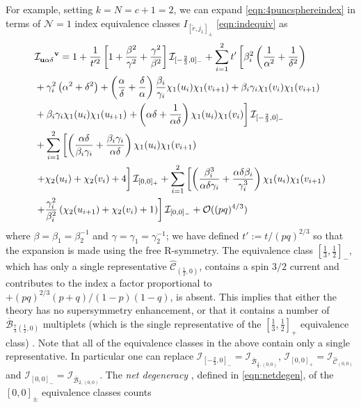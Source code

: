 \documentclass[main.tex]{subfiles}
\begin{document}
For example, setting $k=N=c+1=2$, we can expand \eqref{eqn:4puncsphereindex} in terms of $\mathcal{N}=1$ index equivalence classes $I_{[\widetilde{r},j_1]_{\pm}}$ \eqref{eqn:indequiv} \cite{Gadde:2009dj,Beem:2012yn,Evtikhiev:2017heo} as
\begin{equation}
\begin{aligned}
&\mathcal{I}\indices{_{\mathbf{u}\alpha\delta}^{\mathbf{v}}}=1+\frac{1}{t'^2}\left[1+\frac{\beta^2}{\gamma^2}+\frac{\gamma^2}{\beta^2}\right]\mathcal{I}_{[-\frac{2}{3},0]_-}+\sum_{i=1}^2t'\left[\beta_i^2\left(\frac{1}{\alpha^2}+\frac{1}{\delta^2}\right)\right.\\
&+\gamma_i^2\left(\alpha^2+\delta^2\right)+\left(\frac{\alpha}{\delta}+\frac{\delta}{\alpha}\right)\frac{\beta_i}{\gamma_i}\chi_1(u_i)\chi_1(v_{i+1})+\beta_i\gamma_i\chi_1(v_i)\chi_1(v_{i+1})\\
&+\beta_i\gamma_i\chi_1(u_i)\chi_1(u_{i+1})\left.+\left(\alpha\delta+\frac{1}{\alpha\delta}\right)\chi_1(u_i)\chi_1(v_i)\right]\mathcal{I}_{[-\frac{2}{3},0]_-}\\
&+\sum_{i=1}^2\left[\left(\frac{\alpha\delta}{\beta_i\gamma_i}+\frac{\beta_i\gamma_i}{\alpha\delta}\right)\chi_1(u_i)\chi_1(v_{i+1})\right.\\
&\left.+\chi_2(u_i)+\chi_2(v_i)+4\vphantom{\frac{\alpha\delta}{\beta_i\gamma_i}}\right]\mathcal{I}_{[0,0]_+}+\sum_{i=1}^2\left[\left(\frac{\beta_i^3}{\alpha\delta\gamma_i}+\frac{\alpha\delta\beta_i}{\gamma_i^3}\right)\chi_1(u_i)\chi_1(v_{i+1})\right.\\
&\left.+\frac{\gamma_i^2}{\beta_i^2}\left(\chi_2(u_{i+1})+\chi_2(v_i)+1\right)\right]\mathcal{I}_{[0,0]_-}+\mathcal{O}((pq)^{4/3})
\end{aligned}
\end{equation}
where $\beta=\beta_1=\beta_2^{-1}$ and $\gamma=\gamma_1=\gamma_2^{-1}$; we have defined $t':=t/(pq)^{2/3}$ so that the expansion is made using the free R-symmetry. The equivalence class $[\frac{1}{3},\frac{1}{2}]_-$, which has only a single representative $\hat{\mathcal{C}}_{(\frac{1}{2},0)}$, contains a spin $3/2$ current and contributes to the index a factor proportional to $+(pq)^{2/3}(p+q)/(1-p)(1-q)$, is absent. This implies that either the theory has no supersymmetry enhancement, or that it contains a number of $\overline{\mathcal{B}}_{\frac{7}{3}(\frac{1}{2},0)}$ multiplets (which is the single representative of the $[\frac{1}{3},\frac{1}{2}]_+$ equivalence class) \cite{Evtikhiev:2017heo}. Note that all of the equivalence classes in the above contain only a single representative. In particular one can replace $\mathcal{I}_{[-\frac{2}{3},0]_-}=\mathcal{I}_{\overline{\mathcal{B}}_{\frac{4}{3},(0,0)}}$, $\mathcal{I}_{[0,0]_+}=\mathcal{I}_{\hat{\mathcal{C}}_{(0,0)}}$ and $\mathcal{I}_{[0,0]_-}=\mathcal{I}_{\overline{\mathcal{B}}_{2,(0,0)}}$. The \textit{net degeneracy} \cite{Beem:2012yn}, defined in \eqref{eqn:netdegen}, of the $[0,0]_{\pm}$ equivalence classes counts
\end{document}
